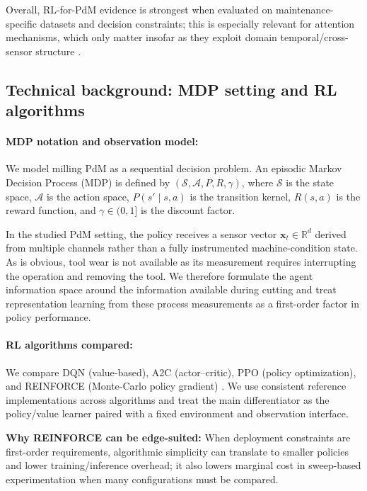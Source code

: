 \documentclass[sn-basic]{sn-jnl} %
\begin{document}
Overall, RL-for-PdM evidence is strongest when evaluated on maintenance-specific datasets and decision constraints; this is especially relevant for attention mechanisms, which only matter insofar as they exploit domain temporal/cross-sensor structure \cite{Zhao2024}.

\subsection{Technical background: MDP setting and RL algorithms}
\label{sec:tech_background}
\paragraph{MDP notation and observation model:}
We model milling PdM as a sequential decision problem. An episodic Markov Decision Process (MDP) is defined by $(\mathcal{S},\mathcal{A},P,R,\gamma)$, where $\mathcal{S}$ is the state space, $\mathcal{A}$ is the action space, $P(s'\mid s,a)$ is the transition kernel, $R(s,a)$ is the reward function, and $\gamma\in(0,1]$ is the discount factor.

In the studied PdM setting, the policy receives a sensor vector $\mathbf{x}_t\in\mathbb{R}^d$ derived from multiple channels rather than a fully instrumented machine-condition state. As is obvious, tool wear is not available as its measurement requires interrupting the operation and removing the tool. We therefore formulate the agent information space around the information available during cutting and treat representation learning from these process measurements as a first-order factor in policy performance.

\paragraph{RL algorithms compared:}
We compare DQN (value-based), A2C (actor--critic), PPO (policy optimization), and \textsc{REINFORCE} (Monte-Carlo policy gradient) \cite{Mnih2015, Schulman2017, Williams1992}. We use consistent reference implementations across algorithms and treat the main differentiator as the policy/value learner paired with a fixed environment and observation interface.

\textbf{Why \textsc{REINFORCE} can be edge-suited:} When deployment constraints are first-order requirements, algorithmic simplicity can translate to smaller policies and lower training/inference overhead; it also lowers marginal cost in sweep-based experimentation when many configurations must be compared.
\end{document}
